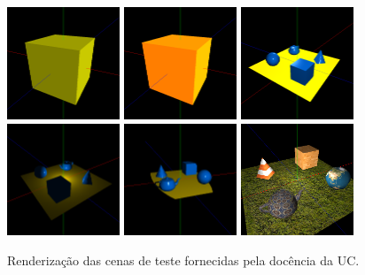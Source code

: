 \documentclass[12pt, a4paper]{article}
\begin{document}
\begin{figure}[H]
    \centering
    \includegraphics[width=0.3\textwidth]{res/phase4/results/Test1.png}
    \includegraphics[width=0.3\textwidth]{res/phase4/results/Test2.png}
    \includegraphics[width=0.3\textwidth]{res/phase4/results/Test3.png}
    \includegraphics[width=0.3\textwidth]{res/phase4/results/Test4.png}
    \includegraphics[width=0.3\textwidth]{res/phase4/results/Test5.png}
    \includegraphics[width=0.3\textwidth]{res/phase4/results/Test6.png}
    \caption{Renderização das cenas de teste fornecidas pela docência da UC.}
\end{figure}
\end{document}
